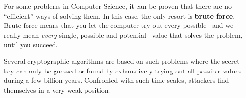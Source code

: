
For some problems in Computer Science, it can be proven that there are
no ``efficient'' ways of solving them. In this case, the only resort is
\textbf{brute force}. Brute force means that you let the computer try out
every possible --and we really mean \emph{every} single, possible and
potential-- value that solves the problem, until you succeed.

Several cryptographic algorithms are based on such problems where the
secret key can only be guessed or found by exhaustively trying
out all possible values during a few billion years. Confronted with
such time scales, attackers find themselves in a very weak position.

